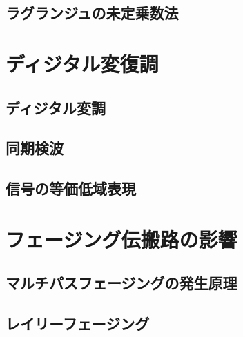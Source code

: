 \subsection{ラグランジュの未定乗数法}

\section{ディジタル変復調}
\subsection{ディジタル変調}
\subsection{同期検波}
\subsection{信号の等価低域表現}

\section{フェージング伝搬路の影響}
\subsection{マルチパスフェージングの発生原理}
\subsection{レイリーフェージング}

